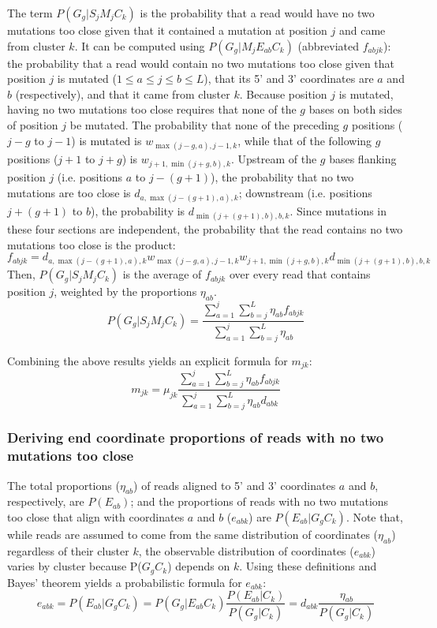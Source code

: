 \documentclass[main.tex]{subfiles}
\begin{document}
The term $P(G_g | S_j M_j C_k)$ is the probability that a read would have no two mutations too close given that it contained a mutation at position $j$ and came from cluster $k$.
It can be computed using $P(G_g | M_j E_{ab} C_k)$ (abbreviated $f_{abjk}$): the probability that a read would contain no two mutations too close given that position $j$ is mutated ($1 \le a \le j \le b \le L$), that its 5' and 3' coordinates are $a$ and $b$ (respectively), and that it came from cluster $k$.
Because position $j$ is mutated, having no two mutations too close requires that none of the $g$ bases on both sides of position $j$ be mutated.
The probability that none of the preceding $g$ positions ($j - g$ to $j - 1$) is mutated is $w_{\max(j-g,a),j-1,k}$, while that of the following $g$ positions ($j + 1$ to $j + g$) is $w_{j+1,\min(j+g,b),k}$.
Upstream of the $g$ bases flanking position $j$ (i.e. positions $a$ to $j - (g + 1)$), the probability that no two mutations are too close is $d_{a,\max(j-(g+1),a),k}$; downstream (i.e. positions $j + (g + 1)$ to $b$), the probability is $d_{\min(j+(g+1),b),b,k}$.
Since mutations in these four sections are independent, the probability that the read contains no two mutations too close is the product:
$$f_{abjk} = d_{a,\max(j-(g+1),a),k} w_{\max(j-g,a),j-1,k} w_{j+1,\min(j+g,b),k} d_{\min(j+(g+1),b),b,k}$$
Then, $P(G_g | S_j M_j C_k)$ is the average of $f_{abjk}$ over every read that contains position $j$, weighted by the proportions $\eta_{ab}$.
$$P(G_g | S_j M_j C_k) = \frac{\sum_{a=1}^{j}\sum_{b=j}^{L}\eta_{ab} f_{abjk}}{\sum_{a=1}^{j}\sum_{b=j}^{L}\eta_{ab}}$$

Combining the above results yields an explicit formula for $m_{jk}$:
$$m_{jk} = \mu_{jk} \frac{\sum_{a=1}^{j}\sum_{b=j}^{L}\eta_{ab} f_{abjk}}{\sum_{a=1}^{j}\sum_{b=j}^{L}\eta_{ab}d_{abk}}$$

\subsubsection{Deriving end coordinate proportions of reads with no two mutations too close}
\label{calc_p_ends_noclose}

The total proportions ($\eta_{ab}$) of reads aligned to 5' and 3' coordinates $a$ and $b$, respectively, are $P(E_{ab})$; and the proportions of reads with no two mutations too close that align with coordinates $a$ and $b$ ($e_{abk}$) are $P(E_{ab} | G_g C_k)$.
Note that, while reads are assumed to come from the same distribution of coordinates ($\eta_{ab}$) regardless of their cluster $k$, the observable distribution of coordinates ($e_{abk}$) varies by cluster because P($G_g C_k$) depends on $k$.
Using these definitions and Bayes' theorem yields a probabilistic formula for $e_{abk}$:
$$e_{abk} = P(E_{ab} | G_g C_k) = P(G_g | E_{ab} C_k) \frac{P(E_{ab} | C_k)}{P(G_g | C_k)} = d_{abk} \frac{\eta_{ab}}{P(G_g | C_k)}$$
\end{document}
